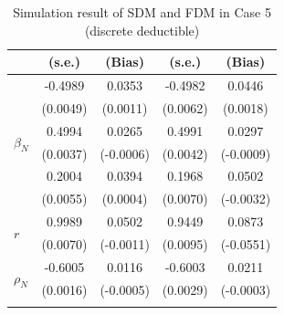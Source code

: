 \begin{table}[!ht]
{{\begin{minipage}{0.5\textwidth}
\begin{tabular}{lcccc}
        & (s.e.) & (Bias) & (s.e.) & (Bias) \\
        \midrule
        \multirow{6}{*}{$\beta_N$} & -0.4989 & 0.0353 & -0.4982 & 0.0446 \\
         & (0.0049) & (0.0011) & (0.0062) & (0.0018) \\
        \cmidrule{2-5}
         & 0.4994 & 0.0265 & 0.4991 & 0.0297 \\
         & (0.0037) & (-0.0006) & (0.0042) & (-0.0009) \\
        \cmidrule{2-5}
         & 0.2004 & 0.0394 & 0.1968 & 0.0502 \\
         & (0.0055) & (0.0004) & (0.0070) & (-0.0032) \\
        \midrule
        \multirow{2}{*}{$r$} & 0.9989 & 0.0502 & 0.9449 & 0.0873 \\
         & (0.0070) & (-0.0011) & (0.0095) & (-0.0551) \\
        \midrule
        \multirow{2}{*}{$\rho_N$} & -0.6005 & 0.0116 & -0.6003 & 0.0211 \\
         & (0.0016) & (-0.0005) & (0.0029) & (-0.0003) \\
        \hhline{=====}
        \end{tabular}
    \end{minipage}
}
}
\caption{Simulation result of SDM and FDM in Case 5 (discrete deductible)}\label{tab:AppSimEndCase5}
\end{table}

